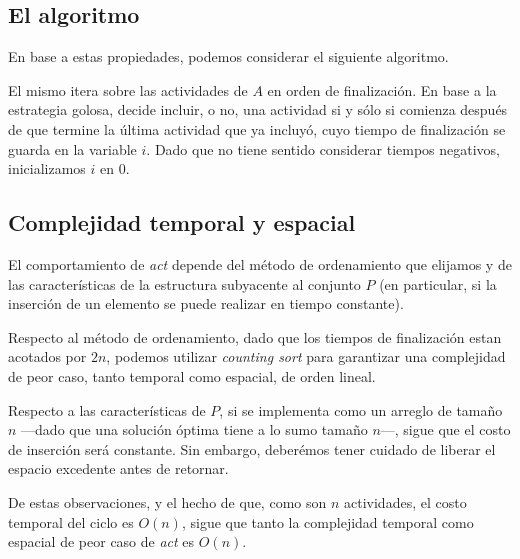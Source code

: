 \subsection{El algoritmo} En base a estas propiedades, podemos considerar el siguiente algoritmo. 

\vspace{0.5em}


El mismo itera sobre las actividades de $A$ en orden de finalización. En base a la estrategia golosa, decide incluir, o no, una actividad si y sólo si comienza después de que termine la última actividad que ya incluyó, cuyo tiempo de finalización se guarda en la variable $i$. Dado que no tiene sentido considerar tiempos negativos, inicializamos $i$ en $0$.

\vspace{0.5em}
\subsection{Complejidad temporal y espacial} El comportamiento de \textit{act} depende del método de ordenamiento que elijamos y de las características de la estructura subyacente al conjunto $P$ (en particular, si la inserción de un elemento se puede realizar en tiempo constante). 

Respecto al método de ordenamiento, dado que los tiempos de finalización estan acotados por $2n$, podemos utilizar \textit{counting sort} para garantizar una complejidad de peor caso, tanto temporal como espacial, de orden lineal. %

Respecto a las características de $P$, si se implementa como un arreglo de tamaño $n$ ---dado que una solución óptima tiene a lo sumo tamaño $n$---, sigue que el costo de inserción será constante. Sin embargo, deberémos tener cuidado de liberar el espacio excedente antes de retornar.

De estas observaciones, y el hecho de que, como son $n$ actividades, el costo temporal del ciclo es $O(n)$, sigue que tanto la complejidad temporal como espacial de peor caso de \textit{act} es $O(n)$.